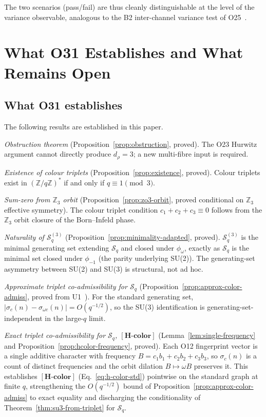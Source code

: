 \documentclass[11pt,a4paper]{article}
\theoremstyle{definition}
\theoremstyle{remark}
\newcommand{\Hcolor}{\mathbf{[H\text{-}color]}}
\newcommand{\Z}{\mathbb{Z}}
\newcommand{\Sq}{\mathcal{S}_q}
\begin{document}
      The two scenarios (pass/fail) are thus cleanly distinguishable at the level of the variance
      observable, analogous to the B2 inter-channel variance test of O25~\cite{Beau2026a29}.

  \section{What O31 Establishes and What Remains Open}
    \label{sec:status}

    \subsection{What O31 establishes}
      \label{ssec:established}

      The following results are established in this paper.

      \emph{Obstruction theorem} (Proposition~\ref{prop:obstruction}, proved).
      The O23 Hurwitz argument cannot directly produce $d_\rho = 3$; a new multi-fibre input is
      required.

      \emph{Existence of colour triplets} (Proposition~\ref{prop:existence}, proved).
      Colour triplets exist in $(\Z/q\Z)^*$ if and only if $q \equiv 1 \pmod{3}$.

      \emph{Sum-zero from $\Z_3$ orbit} (Proposition~\ref{prop:zo3-orbit}, proved conditional on
      $\Z_3$ effective symmetry).
      The colour triplet condition $c_1+c_2+c_3 \equiv 0$ follows from the $\Z_3$ orbit closure
      of the Born--Infeld phase.

      \emph{Naturality of $\Sq^{(3)}$} (Proposition~\ref{prop:minimality-adapted}, proved).
      $\Sq^{(3)}$ is the minimal generating set extending $\Sq$ and closed under $\phi_\omega$,
      exactly as $\Sq$ is the minimal set closed under $\phi_{-1}$ (the parity underlying SU(2)).
      The generating-set asymmetry between SU(2) and SU(3) is structural, not ad hoc.

      \emph{Approximate triplet co-admissibility for $\Sq$} (Proposition~\ref{prop:approx-color-admiss},
      proved from U1~\cite{Beau2026u1}).
      For the standard generating set, $|\sigma_c(n) - \sigma_{\omega c}(n)| = O(q^{-1/2})$,
      so the SU(3) identification is generating-set-independent in the large-$q$ limit.

      \emph{Exact triplet co-admissibility for $\Sq$, $\Hcolor$}
      (Lemma~\ref{lem:single-frequency} and Proposition~\ref{prop:hcolor-frequency}, proved).
      Each O12 fingerprint vector is a single additive character with frequency
      $B = c_1 b_1 + c_2 b_2 + c_3 b_3$, so $\sigma_c(n)$ is a count of distinct frequencies and the
      orbit dilation $B \mapsto \omega B$ preserves it.
      This establishes $\Hcolor$ (Eq.~\eqref{eq:h-color-std}) pointwise on the standard graph at
      finite $q$, strengthening the $O(q^{-1/2})$ bound of Proposition~\ref{prop:approx-color-admiss}
      to exact equality and discharging the conditionality of Theorem~\ref{thm:su3-from-triplet} for
      $\Sq$.
\end{document}
